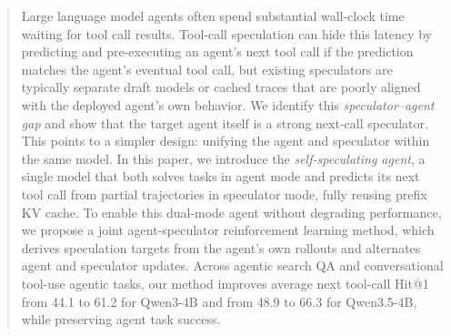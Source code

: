 \begin{abstract}
    Large language model agents often spend substantial wall-clock time waiting for tool call results. Tool-call speculation can hide this latency by predicting and pre-executing an agent's next tool call if the prediction matches the agent's eventual tool call, but existing speculators are typically separate draft models or cached traces that are poorly aligned with the deployed agent's own behavior. We identify this \emph{speculator--agent gap} and show that the target agent itself is a strong next-call speculator.
    This points to a simpler design: unifying the agent and speculator within the same model. In this paper, we introduce the \emph{self-speculating agent}, a single model that both solves tasks in agent mode and predicts its next tool call from partial trajectories in speculator mode, fully reusing prefix KV cache. To enable this dual-mode agent without degrading performance, we propose a joint agent-speculator reinforcement learning method, which derives speculation targets from the agent's own rollouts and alternates agent and speculator updates. Across agentic search QA and conversational tool-use agentic tasks, our method improves average next tool-call Hit@1 from 44.1 to 61.2 for Qwen3-4B and from 48.9 to 66.3 for Qwen3.5-4B, while preserving agent task success.
\end{abstract}
    
